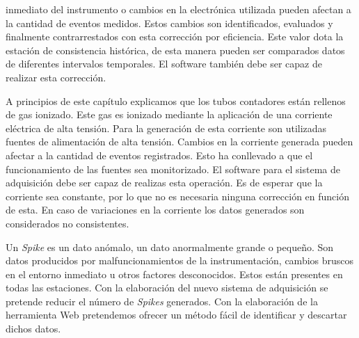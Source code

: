 \begin{description}[leftmargin=0cm]
			inmediato del instrumento o cambios en la electrónica utilizada pueden afectan a la cantidad de eventos medidos. Estos cambios
			son identificados, evaluados y finalmente contrarrestados con esta corrección por eficiencia. Este valor dota la estación de
			consistencia histórica, de esta manera pueden ser comparados datos de diferentes intervalos temporales. El software también
			debe ser capaz de realizar esta corrección. 
		\item[Fuentes de alta tensión]
			A principios de este capítulo explicamos que los tubos contadores están rellenos de gas ionizado. Este gas es ionizado
			mediante la aplicación de una corriente eléctrica de alta tensión. Para la generación de esta corriente son utilizadas fuentes
			de alimentación de alta tensión. Cambios en la corriente generada pueden afectar a la cantidad de eventos registrados. Esto ha
			conllevado a que el funcionamiento de las fuentes sea monitorizado. El software para el sistema de adquisición debe ser capaz
			de realizas esta operación. Es de esperar que la corriente sea constante, por lo que no es necesaria ninguna corrección en
			función de esta. En caso de variaciones en la corriente los datos generados son considerados no consistentes.
		\item[\emph{Spikes}]
			Un \emph{Spike} es un dato anómalo, un dato anormalmente grande o pequeño. Son datos producidos por malfuncionamientos de la
			instrumentación, cambios bruscos en el entorno inmediato u otros factores desconocidos. Estos están presentes en todas las
			estaciones. Con la elaboración del nuevo sistema de adquisición se pretende reducir el número de \emph{Spikes} generados. Con
			la elaboración de la herramienta Web pretendemos ofrecer un método fácil de identificar y descartar dichos datos.
	\end{description}
